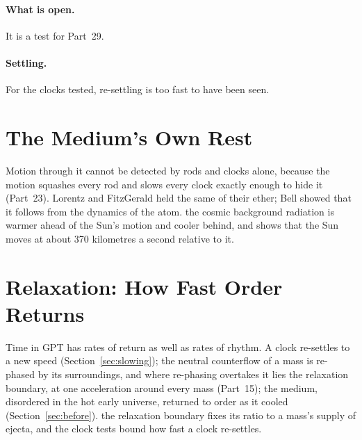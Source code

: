 \documentclass[11pt,a4paper]{article}
\begin{document}
\paragraph{What is open.}  It is a test for Part~29.

\paragraph{Settling.}  For the clocks tested, re-settling is too fast to have been seen. 

\section{The Medium's Own Rest}
\label{sec:rest}

 Motion through it cannot be detected by rods and clocks alone, because the motion squashes every rod and slows every clock exactly enough to hide it (Part~23). Lorentz and FitzGerald held the same of their ether; Bell showed that it follows from the dynamics of the atom.  the cosmic background radiation is warmer ahead of the Sun's motion and cooler behind, and shows that the Sun moves at about 370 kilometres a second relative to it.  

\section{Relaxation: How Fast Order Returns}
\label{sec:relaxation}

Time in GPT has rates of return as well as rates of rhythm.  A clock re-settles to a new speed (Section~\ref{sec:slowing}); the neutral counterflow of a mass is re-phased by its surroundings, and where re-phasing overtakes it lies the relaxation boundary, at one acceleration around every mass (Part~15); the medium, disordered in the hot early universe, returned to order as it cooled (Section~\ref{sec:before}).  the relaxation boundary fixes its ratio to a mass's supply of ejecta, and the clock tests bound how fast a clock re-settles.
\end{document}
